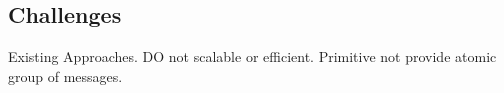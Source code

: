 
\subsection{Challenges}

Existing Approaches. DO not scalable or efficient. Primitive not provide atomic group of messages.